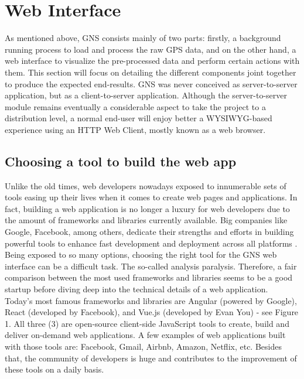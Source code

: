
\section{Web Interface}
As mentioned above, GNS consists mainly of two parts: firstly, a background running process to load and process the raw GPS data, and on the other hand, a web interface to visualize the pre-processed data and perform certain actions with them. This section will focus on detailing the different components joint together to produce the expected end-results.
GNS was never conceived as server-to-server application, but as a client-to-server application. Although the server-to-server module remains eventually a considerable aspect to take the project to a distribution level, a normal end-user will enjoy better a WYSIWYG-based experience using an HTTP Web Client, mostly known as a web browser.

\vspace{1.0cm}
\noindent
\subsection{Choosing a tool to build the web app}

Unlike the old times, web developers nowadays exposed to innumerable sets of tools easing up their lives when it comes to create web pages and applications. In fact, building a web application is no longer a luxury for web developers due to the amount of frameworks and libraries currently available. Big companies like Google, Facebook, among others, dedicate their strengths and efforts in building powerful tools to enhance fast development and deployment across all platforms \cite{angular}.\\

Being exposed to so many options, choosing the right tool for the GNS web interface can be a difficult task. The so-called analysis paralysis. Therefore, a fair comparison between the most used frameworks and libraries seems to be a good startup before diving deep into the technical details of a web application. \\

Today’s most famous frameworks and libraries are Angular (powered by Google), React (developed by Facebook), and Vue.js (developed by Evan You) - see Figure 1. All three (3) are open-source client-side JavaScript tools to create, build and deliver on-demand web applications. A few examples of web applications built with those tools are: Facebook, Gmail, Airbnb, Amazon, Netflix, etc. Besides that, the community of developers is huge and contributes to the improvement of these tools on a daily basis.\\

